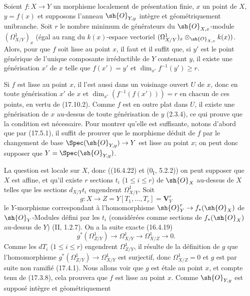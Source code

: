 \begin{proposition}[18.10.21]
\label{IV.18.10.21}
Soient $f:X\to Y$ un morphisme localement de présentation finie, $x$ un point de $X$, $y=f(x)$ et supposons l'anneau $\sh{O}_{Y,y}$ intègre et géométriquement unibranche. Soit $r$ le nombre minimum de générateurs du $\sh{O}_{X,x}$-module $(\Omega^1_{X/Y})_x$ (égal au rang du $k(x)$-espace vectoriel $(\Omega^1_{X/Y})_x\otimes_{\sh{O}_{X,x}}k(x))$. Alors, pour que $f$ soit lisse au point $x$, il faut et il suffit que, si $y'$ est le point générique de l'unique composante irréductible de $Y$ contenant $y$, il existe une générisation $x'$ de $x$ telle que $f(x')=y'$ et $\dim_{x'}f^{-1}(y')\geq r$.
\end{proposition}

Si $f$ est lisse au point $x$, il l'est aussi dans un voisinage ouvert $U$ de $x$, donc en toute générisation $x'$ de $x$ et $\dim_{x'}(f^{-1}(f(x')))=r$ en chacun de ces points, en vertu de (17.10.2). Comme $f$ est en outre plat dans $U$, il existe une générisation de $x$ au-dessus de toute générisation de $y$ (2.3.4), ce qui prouve que la condition est nécessaire. Pour montrer qu'elle est suffisante, notons d'abord que par (17.5.1), il suffit de prouver que le morphisme déduit de $f$ par le changement de base $\Spec(\sh{O}_{Y,y})\to Y$ est lisse au point $x$; on peut donc supposer que $Y=\Spec(\sh{O}_{Y,y})$.

La question est locale sur $X$, donc ((16.4.22) et ($0_{\mathrm I}$, 5.2.2)) on peut supposer que $X$ est affine, et qu'il existe $r$ sections $t_i$ ($1\leq i\leq r$) de $\sh{O}_X$ au-dessus de $X$ telles que les sections $d_{X/Y}t_i$ engendrent $\Omega^1_{X/Y}$. Soit
\[
  g:X\to Z=Y[T_1,\ldots,T_r]=\mathbf V^r_Y
\]
le $Y$-morphisme correspondant à l'homomorphisme $\sh{O}_Y^r\to f_*(\sh{O}_X)$ de $\sh{O}_Y$-Modules défini par les $t_i$ (considérées comme sections de $f_*(\sh{O}_X)$ au-dessus de $Y$) (II, 1.2.7). On a la suite exacte (16.4.19)
\[
  g^*(\Omega^1_{Z/Y})\longrightarrow\Omega^1_{X/Y}\longrightarrow\Omega^1_{X/Z}\longrightarrow0.
\]
Comme les $dT_i$ ($1\leq i\leq r$) engendrent $\Omega^1_{Z/Y}$, il résulte de la définition de $g$ que l'homomorphisme $g^*(\Omega^1_{Z/Y})\to\Omega^1_{X/Y}$ est surjectif, donc $\Omega^1_{X/Z}=0$ et $g$ est par suite non ramifié (17.4.1). Nous allons voir que $g$ est étale au point $x$, et compte tenu de (17.3.8), cela prouvera que $f$ est lisse au point $x$. Comme $\sh{O}_{Y,y}$ est supposé intègre et géométriquement


